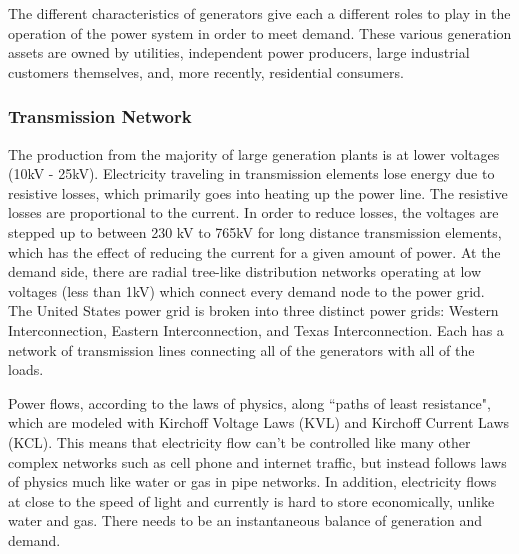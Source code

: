 	The different characteristics of generators give each a different roles to play in the operation of the power system in order to meet demand.  These various generation assets are owned by utilities, independent power producers, large industrial customers themselves, and, more recently, residential consumers.  

\subsubsection{Transmission Network}
	The production from the majority of large generation plants is at lower voltages (10kV - 25kV).  Electricity traveling in transmission elements lose energy due to resistive losses, which primarily goes into heating up the power line.  The resistive losses are proportional to the current.  In order to reduce losses, the voltages are stepped up to between 230 kV to 765kV for long distance transmission elements, which has the effect of reducing the current for a given amount of power.  At the demand side, there are radial tree-like distribution networks operating at low voltages (less than 1kV) which connect every demand node to the power grid.  The United States power grid is broken into three distinct power grids: Western Interconnection, Eastern Interconnection, and Texas Interconnection. Each has a network of transmission lines connecting all of the generators with all of the loads.  

	Power flows, according to the laws of physics, along ``paths of least resistance", which are modeled with Kirchoff Voltage Laws (KVL) and Kirchoff Current Laws (KCL).  This means that electricity flow can't be controlled like many other complex networks such as cell phone and internet traffic, but instead follows laws of physics much like water or gas in pipe networks.  In addition, electricity flows at close to the speed of light and currently is hard to store economically, unlike water and gas.   There needs to be an instantaneous balance of generation and demand.  

